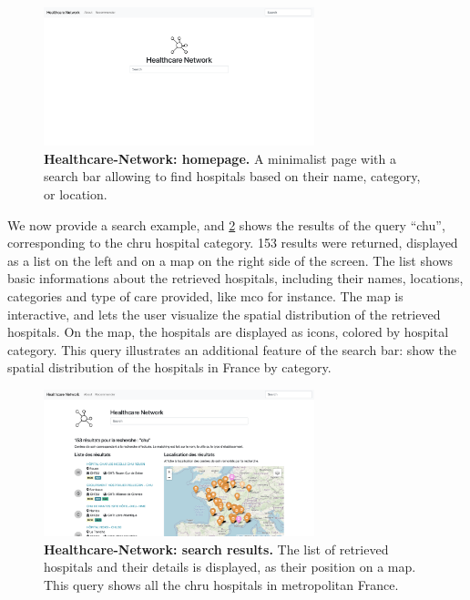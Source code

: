 \begin{figure}[h]
    \includegraphics[width=0.7\textwidth]{images/healthcare-network/home.png}
    \centering
    \caption{ \textbf{Healthcare-Network: homepage.} A minimalist page with a
        search bar allowing to find hospitals based on their name, category, or
        location. }
    \label{fig:hn-home}
\end{figure}

We now provide a search example, and \cref{fig:hn-search} shows the results of
the query ``chu'', corresponding to the \acf{chru} hospital category. 153
results were returned, displayed as a list on the left and on a map on the right
side of the screen. The list shows basic informations about the retrieved
hospitals, including their names, locations, categories and type of care
provided, like \acf{mco} for instance. The map is interactive, and lets the user
visualize the spatial distribution of the retrieved hospitals. On the map, the
hospitals are displayed as icons, colored by hospital category. This query
illustrates an additional feature of the search bar: show the spatial distribution
of the hospitals in France by category.

\begin{figure}[h]
    \includegraphics[width=0.7\textwidth]{images/healthcare-network/search.png}
    \centering
    \caption{ \textbf{Healthcare-Network: search results.} The list of retrieved
        hospitals and their details is displayed, as their position on a map.
        This query shows all the \ac{chru} hospitals in metropolitan France. }
    \label{fig:hn-search}
\end{figure}

